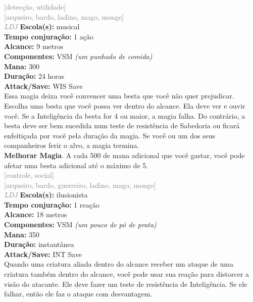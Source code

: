 \documentclass{RPG_Adventure}[2021/10/20]
\begin{document}
{\scriptsize \textcolor{gray}{[detecção, utilidade]\\}}
{\scriptsize \textcolor{gray}{[arqueiro, bardo, ladino, mago, monge]\\}}
{\tiny \textcolor{gray}{\textit{LDJ}}}\jump{}
{\small \t \textbf{Escola(s):} musical\\\t \textbf{Tempo conjuração:} 1 ação\\\t \textbf{Alcance:} 9 metros\\\t \textbf{Componentes:} VSM \textit{(um punhado de comida)}\\\t \textbf{Mana:} 300\\\t \textbf{Duração:} 24 horas\\\t \textbf{Attack/Save:} WIS Save\\}
{\normalsize Essa magia deixa você convencer uma besta que você não quer prejudicar. Escolha uma besta que você possa ver dentro do alcance. Ela deve ver e ouvir você. Se a Inteligência da besta for 4 ou maior, a magia falha. Do contrário, a besta deve ser bem sucedida num teste de resistência de Sabedoria ou ficará enfeitiçada por você pela duração da magia. Se você ou um dos seus companheiros ferir o alvo, a magia termina.\\\t \textbf{Melhorar Magia}. A cada 500 de mana adicional que você gastar, você pode afetar uma besta adicional até o máximo de 5.\\}
{\scriptsize \textcolor{gray}{[controle, social]\\}}
{\scriptsize \textcolor{gray}{[arqueiro, bardo, guerreiro, ladino, mago, monge]\\}}
{\tiny \textcolor{gray}{\textit{LDJ}}}\jump{}
{\small \t \textbf{Escola(s):} ilusionista\\\t \textbf{Tempo conjuração:} 1 reação\\\t \textbf{Alcance:} 18 metros\\\t \textbf{Componentes:} VSM \textit{(um pouco de pó de prata)}\\\t \textbf{Mana:} 350\\\t \textbf{Duração:} instantânea\\\t \textbf{Attack/Save:} INT Save\\}
{\normalsize Quando uma criatura aliada dentro do alcance receber um ataque de uma criatura também dentro do alcance, você pode usar sua reação para distorcer a visão do atacante. Ele deve fazer um teste de resistência de Inteligência. Se ele falhar, então ele faz o ataque com desvantagem.\\}
\end{document}
